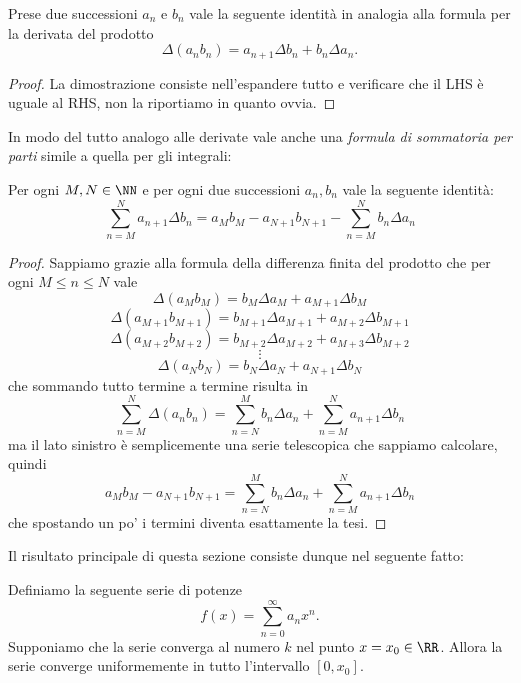 \documentclass[11pt]{scrartcl}
\begin{document}
	 \begin{lemma}
	 	Prese due successioni $a_n$ e $b_n$ vale la seguente identità in analogia alla formula per la derivata del prodotto
	 	$$\Delta \left(a_nb_n\right) = a_{n+1}\Delta b_n + b_n \Delta a_n.$$
	 \end{lemma}
	 \begin{proof}
	 	La dimostrazione consiste nell'espandere tutto e verificare che il LHS è uguale al RHS, non la riportiamo in quanto ovvia.
	 \end{proof}
	 In modo del tutto analogo alle derivate vale anche una \textit{formula di sommatoria per parti} simile a quella per gli integrali:
	 \begin{lemma}
	 	Per ogni $M,N\in \NN$ e per ogni due successioni $a_n,b_n$ vale la seguente identità:
	 	$$\sum_{n=M}^{N}a_{n+1}\Delta b_n=a_{M}b_{M}-a_{N+1}b_{N+1}-\sum_{n=M}^{N}b_n\Delta a_n$$
	 \end{lemma}
	 \begin{proof}
	 	Sappiamo grazie alla formula della differenza finita del prodotto che per ogni $M\le n\le N$ vale
	 	$$\Delta\left(a_Mb_M\right)=b_M\Delta a_M +a_{M+1} \Delta b_M$$
	 	$$\Delta\left(a_{M+1}b_{M+1}\right)=b_{M+1}\Delta a_{M+1} +a_{M+2} \Delta b_{M+1}$$
	 	$$\Delta\left(a_{M+2}b_{M+2}\right)=b_{M+2}\Delta a_{M+2} +a_{M+3} \Delta b_{M+2}$$
	 	$$\vdots$$
	 	$$\Delta\left(a_{N}b_{N}\right)=b_{N}\Delta a_{N} +a_{N+1} \Delta b_{N}$$
	 	che sommando tutto termine a termine risulta in 
	 	$$\sum_{n=M}^{N}\Delta\left(a_nb_n\right)=\sum_{n=N}^{M}b_n\Delta a_n + \sum_{n=M}^{N} a_{n+1} \Delta b_n$$
	 	ma il lato sinistro è semplicemente una serie telescopica che sappiamo calcolare, quindi
	 	$$a_Mb_M-a_{N+1}b_{N+1}=\sum_{n=N}^{M}b_n\Delta a_n + \sum_{n=M}^{N} a_{n+1} \Delta b_n$$
	 	che spostando un po' i termini diventa esattamente la tesi.
	 \end{proof}
	 Il risultato principale di questa sezione consiste dunque nel seguente fatto:
	 \begin{theorem}[Abel]
	 	Definiamo la seguente serie di potenze 
	 	$$f(x)=\sum_{n=0}^{\infty}a_nx^n.$$
	 	Supponiamo che la serie converga al numero $k$ nel punto $x=x_0\in \RR$. Allora la serie converge uniformemente in tutto l'intervallo $[0,x_0]$.
	 \end{theorem}
\end{document}
